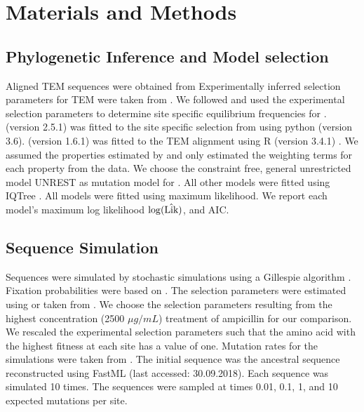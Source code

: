 \documentclass[fleqn,letterpaper]{article}
\begin{document}
\section{Materials and Methods}

\subsection{Phylogenetic Inference and Model selection}

Aligned TEM sequences were obtained from \citet{bloom2017}
Experimentally inferred selection parameters for TEM were taken from \citet{stiffler2016}.
We followed \citep{bloom2017} and used the experimental selection parameters to determine site specific equilibrium frequencies for \phydms. 
\phydms (version 2.5.1) was fitted to the site specific selection from \citet{stiffler2016} using python (version 3.6).
\selac (version 1.6.1) was fitted to the TEM alignment using R (version 3.4.1) \citep{rcore}.
We assumed the \PC properties estimated by \citet{grantham1974} and only estimated the weighting terms for each property from the data.
We choose the constraint free, general unrestricted model UNREST \citep{Yang1994} as mutation model for \selac.
All other models were fitted using IQTree \citep{nguyen2015}.
All models were fitted using maximum likelihood.
We report each model's maximum log likelihood $\log(\hat{\text{Lik}})$, and AIC.


\subsection{Sequence Simulation}

Sequences were simulated by stochastic simulations using a Gillespie algorithm \citep{gillespie1976}.
Fixation probabilities were based on \citet{SellaAndHirsh2005}.
The selection parameters were estimated using \selac or taken from \citet{stiffler2016}.
We choose the selection parameters resulting from the highest concentration (2500 $\mu g/mL$) treatment of ampicillin for our comparison.
We rescaled the experimental selection parameters such that the amino acid with the highest fitness at each site has a value of one.
Mutation rates for the simulations were taken from \selac.
The initial sequence was the ancestral sequence reconstructed using FastML \citep{fastml} (last accessed: 30.09.2018).
Each sequence was simulated 10 times. %
The sequences were sampled at times 0.01, 0.1, 1, and 10 expected mutations per site.
\end{document}
